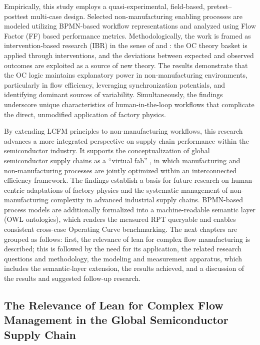\documentclass[preprint,12pt,authoryear]{elsarticle}
\newcounter{metric}
\begin{document}
Empirically, this study employs a quasi-experimental, field-based, pretest--posttest multi-case design. Selected non-manufacturing enabling processes are modeled utilizing BPMN-based workflow representations and analyzed using Flow Factor (FF) based performance metrics. Methodologically, the work is framed as intervention-based research (IBR) in the sense of \citet{oliva2019intervention} and \citet{chandrasekaran2020ibr}: the OC theory basket is applied through interventions, and the deviations between expected and observed outcomes are exploited as a source of new theory. The results demonstrate that the OC logic maintains explanatory power in non-manufacturing environments, particularly in flow efficiency, leveraging synchronization potentials, and identifying dominant sources of variability. Simultaneously, the findings underscore unique characteristics of human-in-the-loop workflows that complicate the direct, unmodified application of factory physics.

By extending LCFM principles to non-manufacturing workflows, this research advances a more integrated perspective on supply chain performance within the semiconductor industry. It supports the conceptualization of global semiconductor supply chains as a ``virtual fab'' \citep{ehm2011}, in which manufacturing and non-manufacturing processes are jointly optimized within an interconnected efficiency framework. The findings establish a basis for future research on human-centric adaptations of factory physics and the systematic management of non-manufacturing complexity in advanced industrial supply chains. BPMN-based process models are additionally formalized into a machine-readable semantic layer (OWL ontologies), which renders the measured RPT queryable and enables consistent cross-case Operating Curve benchmarking. The next chapters are grouped as follows: first, the relevance of lean for complex flow manufacturing is described; this is followed by the need for its application, the related research questions and methodology, the modeling and measurement apparatus, which includes the semantic-layer extension, the results achieved, and a discussion of the results and suggested follow-up research.

\subsection{The Relevance of Lean for Complex Flow Management in the Global Semiconductor Supply Chain}\label{sec:The Relevance of Lean for Complex Flow Management in the Global Semiconductor Supply Chain}
\end{document}
